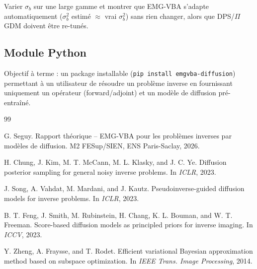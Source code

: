 \documentclass[12pt]{article}
\begin{document}
Varier $\sigma_b$ sur une large gamme et montrer que EMG-VBA s'adapte automatiquement ($\sigma_b^2$ estimé $\approx$ vrai $\sigma_b^2$) sans rien changer, alors que DPS/$\Pi$GDM doivent être re-tunés.

\subsection{Module Python}

Objectif à terme : un package installable (\texttt{pip install emgvba-diffusion}) permettant à un utilisateur de résoudre un problème inverse en fournissant uniquement un opérateur (forward/adjoint) et un modèle de diffusion pré-entraîné.

\newpage

\begin{thebibliography}{99}

G. Seguy.
\newblock Rapport théorique -- EMG-VBA pour les problèmes inverses par modèles de diffusion.
\newblock M2 FESup/SIEN, ENS Paris-Saclay, 2026.

H. Chung, J. Kim, M. T. McCann, M. L. Klasky, and J. C. Ye.
\newblock Diffusion posterior sampling for general noisy inverse problems.
\newblock In \textit{ICLR}, 2023.

J. Song, A. Vahdat, M. Mardani, and J. Kautz.
\newblock Pseudoinverse-guided diffusion models for inverse problems.
\newblock In \textit{ICLR}, 2023.

B. T. Feng, J. Smith, M. Rubinstein, H. Chang, K. L. Bouman, and W. T. Freeman.
\newblock Score-based diffusion models as principled priors for inverse imaging.
\newblock In \textit{ICCV}, 2023.

Y. Zheng, A. Fraysse, and T. Rodet.
\newblock Efficient variational Bayesian approximation method based on subspace optimization.
\newblock In \textit{IEEE Trans. Image Processing}, 2014.

\end{thebibliography}
\end{document}
